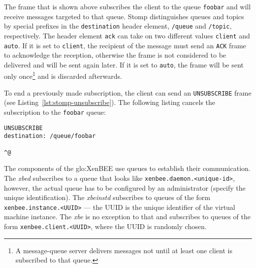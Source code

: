 The  frame  that  is  shown  above  subscribes the  client  to  the  queue
\texttt{foobar} and  will receive messages  targeted to that  queue. Stomp
distinguishes   queues   and   topics   by   special   prefixes   in   the
\texttt{destination}    header    element,    \ie   \texttt{/queue}    and
\texttt{/topic}, respectively. The header element \texttt{ack} can take on
two different  values \texttt{client} and  \texttt{auto}. If it is  set to
\texttt{client}, the  recipient of the  message must send  an \texttt{ACK}
frame to acknowledge the reception,  otherwise the frame is not considered
to  be  delivered  and  will  be  sent  again later.   If  it  is  set  to
\texttt{auto}, the  frame will be sent  only once\footnote{A message-queue
  server delivers messages not until  at least one client is subscribed to
  that queue.}  and is discarded afterwards.

To  end   a  previously  made   subscription,  the  client  can   send  an
\texttt{UNSUBSCRIBE} frame  (see Listing~\ref{lst:stomp-unsubscribe}). The
following listing cancels the subscription to the \texttt{foobar} queue:

\medskip
\begin{center}
  \begin{minipage}{.75\textwidth}
    \begin{lstlisting}[captionpos=b,backgroundcolor=\color{listingcolor},frame=lines,numbers=none,stepnumber=5,numberfirstline=false,numberstyle=\tiny,caption={The
        \texttt{UNSUBSCRIBE} frame revokes a previously made subscription.},label={lst:stomp-unsubscribe}]
UNSUBSCRIBE
destination: /queue/foobar

^@
    \end{lstlisting}
  \end{minipage}
\end{center}

\medskip

The  components of  the  \gls{glo:XenBEE} use  queues  to establish  their
communication.   The \emph{xbed}  subscribes to  a queue  that  looks like
\texttt{xenbee.daemon.<unique-id>},  however, the actual  queue has  to be
configured by  an administrator  (\ie specify the  unique identification).
The    \emph{xbeinstd}    subscribes     to    queues    of    the    form
\texttt{xenbee.instance.<UUID>} ---  the UUID is the  unique identifier of
the virtual machine  instance. The \emph{xbe} is no  exception to that and
subscribes to queues of  the form \texttt{xenbee.client.<UUID>}, where the
UUID is randomly chosen.



